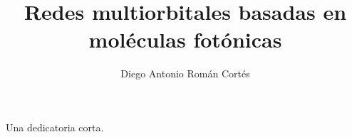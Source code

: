 \documentclass[hyphens]{umemoria}
\author{Diego Antonio Román Cortés}
\title{Redes multiorbitales basadas en moléculas fotónicas}
\begin{document}
\frontmatter
\maketitle

\begin{resumen}
\lipsum[1-4]
\end{resumen}


\begin{dedicatoria}
Una dedicatoria corta.
\end{dedicatoria}

\begin{thanks}
\lipsum[1-2]
\end{thanks}

\tableofcontents
\listoftables %
\listoffigures %

\mainmatter










\begin{appendices}

\end{appendices}
\end{document}
